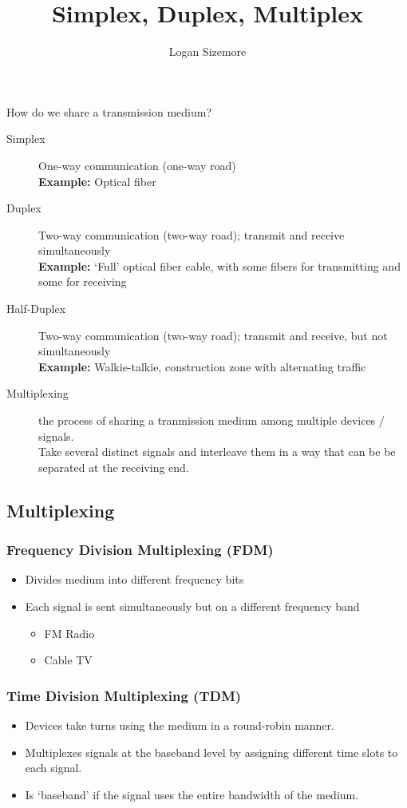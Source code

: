 \documentclass{article}
\title{Simplex, Duplex, Multiplex}
\author{Logan Sizemore}
\begin{document}
\maketitle

How do we share a transmission medium?
\begin{description}
    \item[Simplex] One-way communication (one-way road) \\
          \textbf{Example:} Optical fiber
    \item[Duplex] Two-way communication (two-way road); transmit and receive simultaneously \\
          \textbf{Example:} `Full' optical fiber cable, with some fibers for transmitting and some for receiving
    \item[Half-Duplex] Two-way communication (two-way road); transmit and receive, but not simultaneously \\
          \textbf{Example:} Walkie-talkie, construction zone with alternating traffic
    \item[Multiplexing] the process of sharing a tranmission medium among multiple devices / signals. \\
          Take several distinct signals and interleave them in a way that can be be separated at the receiving end.
\end{description}

\subsection*{Multiplexing}
\subsubsection*{Frequency Division Multiplexing (FDM)}
\begin{itemize}
    \item Divides medium into different frequency bits
    \item Each signal is sent simultaneously but on a different frequency band
          \begin{itemize}
              \item FM Radio
              \item Cable TV
          \end{itemize}
\end{itemize}

\subsubsection*{Time Division Multiplexing (TDM)}
\begin{itemize}
    \item Devices take turns using the medium in a round-robin manner.
    \item Multiplexes signals at the baseband level by assigning different time slots to each signal.
    \item Is `baseband' if the signal uses the entire bandwidth of the medium.
\end{itemize}
\end{document}
